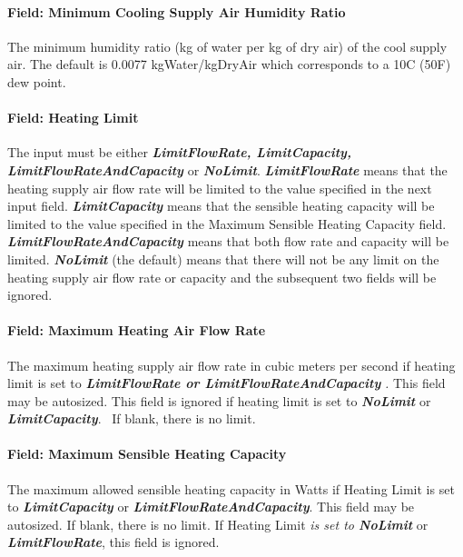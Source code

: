 \paragraph{Field: Minimum Cooling Supply Air Humidity Ratio}\label{field-minimum-cooling-supply-air-humidity-ratio-000}

The minimum humidity ratio (kg of water per kg of dry air) of the cool supply air. The default is 0.0077 kgWater/kgDryAir which corresponds to a 10C (50F) dew point.

\paragraph{Field: Heating Limit}\label{field-heating-limit-000}

The input must be either \textbf{\emph{LimitFlowRate, LimitCapacity, LimitFlowRateAndCapacity}} or \textbf{\emph{NoLimit}}. \textbf{\emph{LimitFlowRate}} means that the heating supply air flow rate will be limited to the value specified in the next input field. \textbf{\emph{LimitCapacity}} means that the sensible heating capacity will be limited to the value specified in the Maximum Sensible Heating Capacity field. \textbf{\emph{LimitFlowRateAndCapacity}} means that both flow rate and capacity will be limited. \textbf{\emph{NoLimit}} (the default) means that there will not be any limit on the heating supply air flow rate or capacity and the subsequent two fields will be ignored.

\paragraph{Field: Maximum Heating Air Flow Rate}\label{field-maximum-heating-air-flow-rate-001}

The maximum heating supply air flow rate in cubic meters per second if heating limit is set to \textbf{\emph{LimitFlowRate or LimitFlowRateAndCapacity}} \emph{.} This field may be autosized. This field is ignored if heating limit is set to \textbf{\emph{NoLimit}} or \textbf{\emph{LimitCapacity}}.~ If blank, there is no limit.

\paragraph{Field: Maximum Sensible Heating Capacity}\label{field-maximum-sensible-heating-capacity-000}

The maximum allowed sensible heating capacity in Watts if Heating Limit is set to \textbf{\emph{LimitCapacity}} or \textbf{\emph{LimitFlowRateAndCapacity}}. This field may be autosized. If blank, there is no limit. If Heating Limit \emph{is set to \textbf{NoLimit}} or \textbf{\emph{LimitFlowRate}}, this field is ignored.

